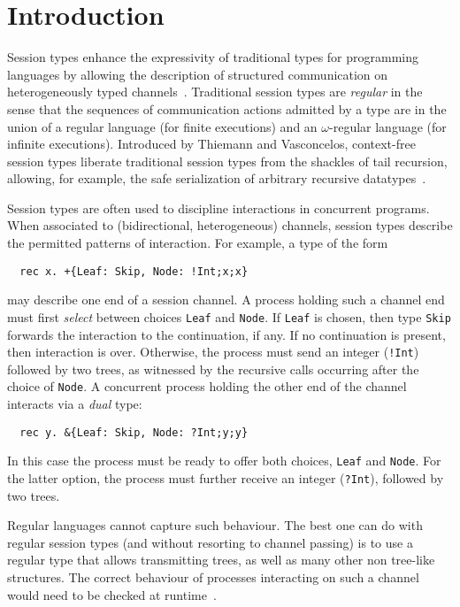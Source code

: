 \section{Introduction}
\label{sec:introduction}

Session types enhance the expressivity of traditional types for
programming languages by allowing the description of structured
communication on heterogeneously typed
channels~\cite{DBLP:conf/concur/Honda93,DBLP:conf/esop/HondaVK98,DBLP:conf/parle/TakeuchiHK94}.
%
Traditional session types are \emph{regular} in the sense that the
sequences of communication actions admitted by a type are in the union
of a regular language (for finite executions) and an $\omega$-regular
language (for infinite executions).
%
Introduced by Thiemann and Vasconcelos, context-free session types
liberate traditional session types from the shackles of tail
recursion, allowing, for example, the safe serialization of arbitrary
recursive datatypes~\cite{thiemann2016context}.

Session types are often used to discipline interactions in concurrent
programs. When associated to (bidirectional, heterogeneous) channels,
session types describe the permitted patterns of interaction. For
example, a type of the form
%
\begin{lstlisting}
  rec x. +{Leaf: Skip, Node: !Int;x;x}
\end{lstlisting}
%
may describe one end
of a session channel. A process holding such a channel end must first
\emph{select} between choices \lstinline|Leaf| and
\lstinline|Node|. If \lstinline|Leaf| is chosen, then type
\lstinline|Skip| forwards the interaction to the continuation, if
any. If no continuation is present, then interaction is
over. Otherwise, the process must send an integer (\lstinline|!Int|)
followed by two trees, as witnessed by the recursive calls occurring
after the choice of \lstinline|Node|.
%
A concurrent process holding the other end of the channel 
interacts via a \emph{dual} type:
%
\begin{lstlisting}
  rec y. &{Leaf: Skip, Node: ?Int;y;y}
\end{lstlisting}
%
In this case the process must be ready to offer both choices,
\lstinline|Leaf| and \lstinline|Node|. For the latter option, the
process must further receive an integer (\lstinline|?Int|), followed
by two trees.

Regular languages cannot capture such behaviour. The best one can do
with regular session types (and without resorting to channel passing)
is to use a regular type that allows transmitting trees, as well as
many other non tree-like structures. The correct behaviour of
processes interacting on such a channel would need to be checked at
runtime~\cite{almeida.etal_freest-functional-language,thiemann2016context}.

